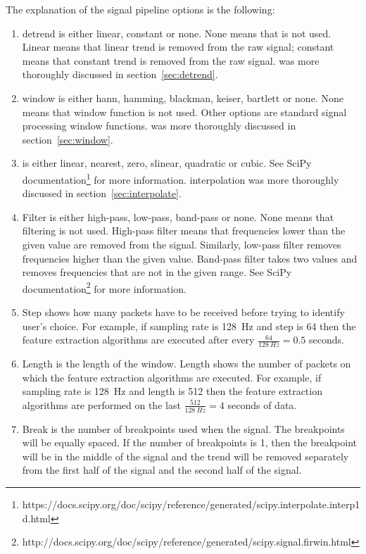The explanation of the signal pipeline options is the following:
\begin{enumerate}
	\item \Gls{detrend} is either linear, constant or none. None means that  is not used. Linear means that linear trend is removed from the raw signal; constant means that constant trend is removed from the raw signal.  was more thoroughly discussed in section~\ref{sec:detrend}.
	\item \Gls{window} is either hann, hamming, blackman, keiser, bartlett or none. None means that \gls{window} function is not used. Other options are standard signal processing \gls{window} functions.  was more thoroughly discussed in section~\ref{sec:window}.
	\item {} is either linear, nearest, zero, slinear, quadratic or cubic. See SciPy documentation\footnote{https://docs.scipy.org/doc/scipy/reference/generated/scipy.interpolate.interp1d.html} for more information. \Gls{interpolation} was more thoroughly discussed in section~\ref{sec:interpolate}.
	\item Filter is either high-pass, low-pass, band-pass or none. None means that filtering is not used. High-pass filter means that frequencies lower than the given value are removed from the signal. Similarly, low-pass filter removes frequencies higher than the given value. Band-pass filter takes two values and removes frequencies that are not in the given range. See SciPy documentation\footnote{http://docs.scipy.org/doc/scipy/reference/generated/scipy.signal.firwin.html} for more information. 
	\item Step shows how many packets have to be received before trying to identify user's choice. For example, if \gls{sampling rate} is \SI{128}{Hz} and step is 64 then the \gls{feature extraction} algorithms are executed after every $\frac{64}{\SI{128}{Hz}}=0.5$ seconds.
	\item Length is the length of the window. Length shows the number of packets on which the \gls{feature extraction} algorithms are executed. For example, if \gls{sampling rate} is \SI{128}{Hz} and length is 512 then the \gls{feature extraction} algorithms are performed on the last $\frac{512}{\SI{128}{Hz}}=4$ seconds of data.
	\item Break is the number of breakpoints used when  the signal. The breakpoints will be equally spaced. If the number of breakpoints is 1, then the breakpoint will be in the middle of the signal and the trend will be removed separately from the first half of the signal and the second half of the signal.

\end{enumerate}

